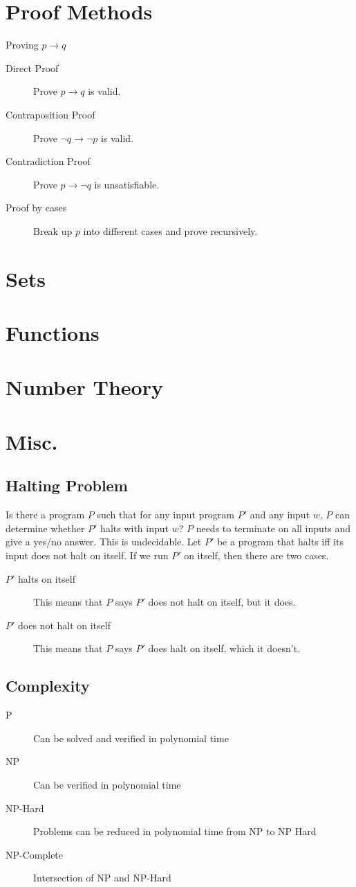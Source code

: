 \documentclass[a4paper]{article}
\begin{document}
\section{Proof Methods}
Proving $p \to q$
\begin{description}
    \item[Direct Proof] Prove $p \to q$ is valid.
    \item[Contraposition Proof] Prove $\neg q \to \neg p$ is valid.
    \item[Contradiction Proof] Prove $p \to \neg q$ is unsatisfiable.
    \item[Proof by cases] Break up $p$ into different cases and prove recursively.
\end{description}

\section{Sets}

\section{Functions}

\section{Number Theory}

\section{Misc.}
\subsection{Halting Problem}
Is there a program $P$ such that for any input program $P'$ and any input $w$, $P$ can determine whether $P'$ halts with input $w$? $P$ needs to terminate on all inputs and give a yes/no answer. This is undecidable. Let $P'$ be a program that halts iff its input does not halt on itself. If we run $P'$ on itself, then there are two cases.
\begin{description}
    \item[$P'$ halts on itself] This means that $P$ says $P'$ does not halt on itself, but it does.
    \item[$P'$ does not halt on itself] This means that $P$ says $P'$ does halt on itself, which it doesn't.
\end{description}

\subsection{Complexity}
\begin{description}
    \item[P] Can be solved and verified in polynomial time
    \item[NP] Can be verified in polynomial time
    \item[NP-Hard] Problems can be reduced in polynomial time from NP to NP Hard
    \item[NP-Complete] Intersection of NP and NP-Hard
\end{description}
\end{document}
